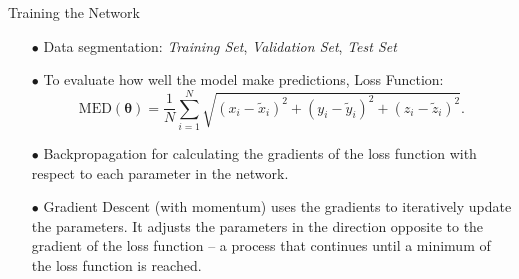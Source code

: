 \documentclass[aspectratio=169, 9pt]{beamer}
\begin{document}
\begin{frame}{Training the Network}
    \begin{itemize}
      \item[$\bullet$] Data segmentation: \emph{Training Set}, \emph{Validation Set}, \emph{Test Set}
      \item[$\bullet$] To evaluate how well the model make predictions, Loss Function:
      \begin{equation}
        \text{MED}(\boldsymbol{\theta})
          = \frac{1}{N} \sum_{i=1}^{N}
              \sqrt{(x_i - \tilde{x}_i)^2 + (y_i - \tilde{y}_i)^2 + (z_i - \tilde{z}_i)^2}.
      \end{equation}
      \item[$\bullet$] Backpropagation for calculating the gradients of the loss function with respect to each parameter in the network.
      \item[$\bullet$] Gradient Descent (with momentum) uses the gradients to iteratively update the parameters. It adjusts the parameters in the direction opposite to the gradient of the loss function -- a process that continues until a minimum of the loss function is reached.
    \end{itemize}
\end{frame}

\end{document}
